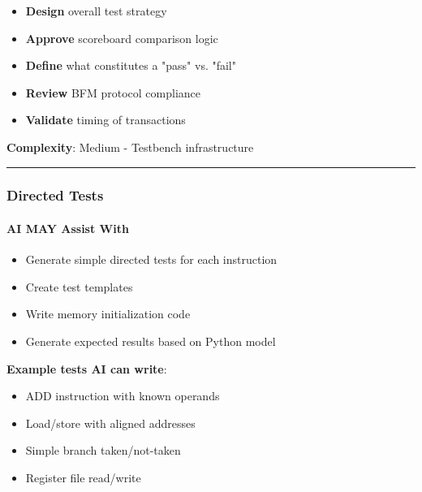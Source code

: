 \begin{record}

\begin{itemize}
\tightlist
\item
  \textbf{Design} overall test strategy
\item
  \textbf{Approve} scoreboard comparison logic
\item
  \textbf{Define} what constitutes a "pass" vs. "fail"
\item
  \textbf{Review} BFM protocol compliance
\item
  \textbf{Validate} timing of transactions
\end{itemize}

\textbf{Complexity}: \partialmark{} Medium - Testbench infrastructure

\begin{center}\rule{0.5\linewidth}{0.5pt}\end{center}

\end{record}

\subsubsection{Directed Tests}\label{cr:status:phase1-ai-human-responsibilities:directed-tests}

\paragraph{\texorpdfstring{\ok{} AI MAY Assist
With}{ AI MAY Assist With}}\label{cr:status:phase1-ai-human-responsibilities:white-check-mark-ai-may-assist-with-11}

\begin{record}

\begin{itemize}
\tightlist
\item
  Generate simple directed tests for each instruction
\item
  Create test templates
\item
  Write memory initialization code
\item
  Generate expected results based on Python model
\end{itemize}

\textbf{Example tests AI can write}:

\begin{itemize}
\tightlist
\item
  ADD instruction with known operands
\item
  Load/\allowbreak{}store with aligned addresses
\item
  Simple branch taken/\allowbreak{}not-taken
\item
  Register file read/\allowbreak{}write
\end{itemize}

\end{record}

